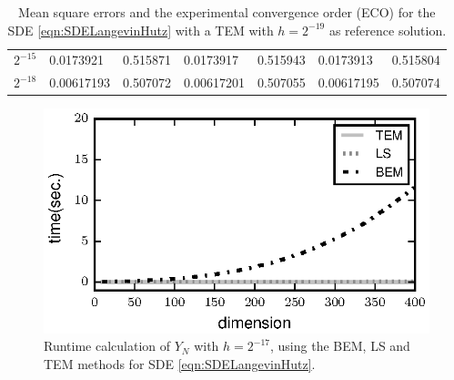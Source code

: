 \documentclass[sort&compress, preprint]{elsarticle}
\theoremstyle{definition}
\theoremstyle{plain}%
\theoremstyle{remark}
\newcommand{\SM}{LS\xspace}
\begin{document}
\begin{table}[t]
\begin{tabular}{lllllll}
		$2^{-15}$	& \num{0.0173921}  & \num{0.515871} & \num{0.0173917}  & \num{0.515943} & \num{0.0173913}& 
		\num{0.515804} \\
		$2^{-18}$ 	& \num{0.00617193} & \num{0.507072} & \num{0.00617201} & \num{0.507055} & 
		\num{0.00617195}&\num{0.507074} \\
		\bottomrule
	\end{tabular}
	\caption{
		Mean square errors and the experimental convergence order (ECO) for the SDE \eqref{eqn:SDELangevinHutz} with 
		a TEM with $h = 2^{-19}$ as reference solution.
	}\label{tbl:OrdersLS}
\end{table}
\begin{figure}[t]
	\centering
	\includegraphics{TimeVsDimension}
	\caption{
		Runtime calculation of $Y_N$ with $h=2^{-17}$, using the BEM,  \SM and TEM methods for 
		SDE \eqref{eqn:SDELangevinHutz}.
	}
	\label{fig:TimeVsDimension}
\end{figure}
\end{document}
